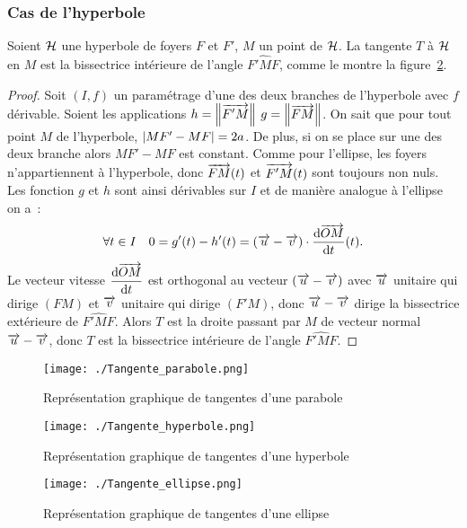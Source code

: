 \subsubsection{Cas de l'hyperbole}
\begin{prop}
  Soient \(\mathcal{H}\) une hyperbole de foyers \(F\) et \(F'\), \(M\) un point 
  de \(\mathcal{H}\). La tangente \(T\) à \(\mathcal{H}\) en \(M\) est la bissectrice 
  intérieure de l'angle \(\widehat{F'MF}\), comme le montre la 
  figure~\ref{fig:tangente_hyperbole}.
\end{prop}
\begin{proof}
  Soit \((I,f)\) un paramétrage d'une des deux branches de l'hyperbole 
  avec \(f\) dérivable. Soient les applications \(h=\left\lVert\overrightarrow{F'M}\right\rVert\) 
  \(g=\left\lVert\overrightarrow{FM}\right\rVert\). On sait que pour tout point \(M\) de 
  l'hyperbole, \(\left\lvert MF'-MF\right\rvert=2a\). De plus, si on se place sur une des 
  deux branche alors \(MF'-MF\) est constant. Comme pour l'ellipse, les 
  foyers n'appartiennent à l'hyperbole, donc \(\overrightarrow{FM}(t)\) et 
  \(\overrightarrow{F'M}(t)\) sont toujours non nuls. Les fonction \(g\) et \(h\) 
  sont ainsi dérivables sur \(I\) et de manière analogue à l'ellipse on 
  a~:
  \begin{equation}
    \forall t \in I \quad 0=g'(t)-h'(t)=(\overrightarrow{u}-\overrightarrow{v})\cdot 
    \dfrac{\mathrm{d} \overrightarrow{OM}}{\mathrm{d} t}(t).
  \end{equation}
  Le vecteur vitesse \(\dfrac{\mathrm{d} \overrightarrow{OM}}{\mathrm{d} t}\) est orthogonal au 
  vecteur \((\overrightarrow{u}-\overrightarrow{v})\) avec \(\overrightarrow{u}\) unitaire qui dirige 
  \((FM)\) et \(\overrightarrow{v}\) unitaire qui dirige \((F'M)\), donc 
  \(\overrightarrow{u}-\overrightarrow{v}\) dirige la bissectrice extérieure de 
  \(\widehat{F'MF}\). Alors \(T\) est la droite passant par \(M\) de 
  vecteur normal \(\overrightarrow{u}-\overrightarrow{v}\), donc \(T\) est la bissectrice 
  intérieure de l'angle \(\widehat{F'MF}\).
\end{proof}
\begin{figure}
  \centering
  \texttt{[image: ./Tangente\_parabole.png]}
  \caption{Représentation graphique de tangentes d'une parabole}
  \label{fig:tangente_parabole}
\end{figure}
\begin{figure}
  \centering
  \texttt{[image: ./Tangente\_hyperbole.png]}
  \caption{Représentation graphique de tangentes d'une hyperbole}
  \label{fig:tangente_hyperbole}
\end{figure}
\begin{figure}
  \centering
  \texttt{[image: ./Tangente\_ellipse.png]}
  \caption{Représentation graphique de tangentes d'une ellipse}
  \label{fig:tangente_ellipse}
\end{figure}
\newpage
